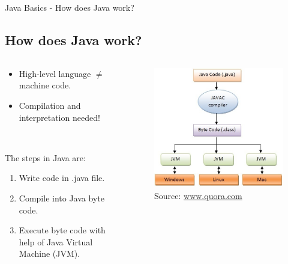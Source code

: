 \documentclass[11pt]{beamer}
\newcommand{\nologo}{\setbeamertemplate{logo}{}}
\newcommand{\reducedfontsizesmall}{\fontsize{10pt}{12}\selectfont}
\begin{document}
	{\nologo
	\begin{frame}{Java Basics - How does Java work?}
		\subsection{How does Java work?}
		\begin{columns}[T,onlytextwidth]
			\begin{column}{.4\textwidth}
				\begin{minipage}{\textwidth}
					\begin{itemize}
						\item{High-level language $\neq$ machine code.}
						\item{Compilation and interpretation needed!}
					\end{itemize}
					~\\
					{\reducedfontsizesmall
					The steps in Java are:
					\begin{enumerate}
						\item{Write code in .java file.}
						\item{Compile into Java byte code.}
						\item{Execute byte code with help of Java Virtual Machine (JVM).}
					\end{enumerate}
					}
				\end{minipage}
			\end{column}
			\begin{column}{.4\textwidth}
				\begin{minipage}{\textwidth}
					\begin{figure}
						\centering
						\includegraphics[scale=0.26]{images/how_does_java_work.jpeg}
						\caption{Source: \href{https://www.quora.com/What-is-the-Java-virtual-machine-JVM}{www.quora.com}}
					\end{figure}
				\end{minipage}			
			\end{column}
		\end{columns}
	\end{frame}
	}
	
\end{document}
